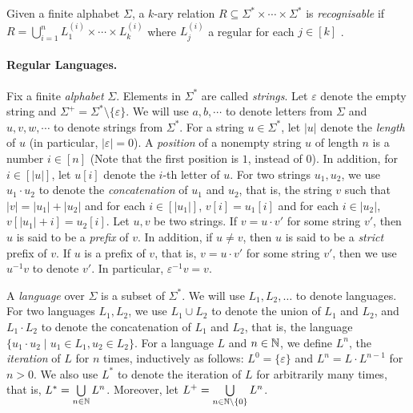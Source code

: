 \documentclass{llncs}
\newcommand{\tl}[1]{\color{blue} {TL: #1 :LT} \color{black}}
\newcommand{\tl}[1]{}
\begin{document}

\begin{definition}
	Given a finite alphabet $\Sigma$, a $k$-ary relation $R\subseteq \Sigma^*\times \cdots\times \Sigma^*$ is \emph{recognisable}  if $R=\bigcup_{i=1}^n L^{(i)}_1\times \cdots\times L^{(i)}_k$ where $L^{(i)}_j$ a regular for each $j\in [k]$ .
%
\end{definition}



\paragraph{Regular Languages.}
Fix a finite \emph{alphabet} $\Sigma$. Elements in $\Sigma^*$ are called \emph{strings}. Let $\varepsilon$ denote the empty string and  $\Sigma^+ = \Sigma^* \setminus \{\varepsilon\}$. We will use $a,b,\cdots$ to denote letters from $\Sigma$ and $u, v, w, \cdots$ to denote strings from $\Sigma^*$. For a string $u \in \Sigma^*$, let $|u|$ denote the \emph{length} of $u$ (in particular, $|\varepsilon|=0$). A \emph{position} of a nonempty string $u$ of length $n$ is a number $i \in [n]$ (Note that the first position is $1$, instead of  0). In addition, for $i \in [|u|]$, let $u[i]$ denote the $i$-th letter of $u$.
For two strings $u_1, u_2$, we use $u_1 \cdot u_2$ to denote the \emph{concatenation} of $u_1$ and $u_2$, that is, the string $v$ such that $|v|= |u_1| + |u_2|$ and for each $i \in [|u_1|]$, $v[i]= u_1[i]$ and for each $i \in |u_2|$, $v[|u_1|+i]=u_2[i]$. Let $u, v$ be two strings. If $v = u \cdot v'$ for some string $v'$, then $u$ is said to be a \emph{prefix} of $v$. In addition, if $u \neq v$, then $u$ is said to be a \emph{strict} prefix of $v$. If $u$ is a prefix of $v$, that is, $v = u \cdot v'$ for some string $v'$, then
we use $u^{-1} v$ to denote $v'$. In particular, $\varepsilon^{-1} v = v$.

A \emph{language} over $\Sigma$ is a subset of $\Sigma^*$. We will use $L_1, L_2, \dots$ to denote languages. For two languages $L_1, L_2$, we use $L_1 \cup L_2$ to denote the union of $L_1$ and $L_2$, and $L_1 \cdot L_2$ to denote the concatenation of $L_1$ and $L_2$, that is, the language $\{u_1 \cdot u_2 \mid u_1 \in L_1, u_2 \in L_2\}$. For a language $L$ and $n \in \mathbb{N}$, we define $L^n$, the \emph{iteration} of $L$ for $n$ times, inductively as follows: $L^0=\{\varepsilon\}$ and $L^{n} =L \cdot L^{n-1}$ for $n > 0$. We also use $L^*$ to denote the iteration of $L$ for arbitrarily many times, that is, $L^* = \bigcup \limits_{n \in \mathbb{N}} L^n$. Moreover, let $L^+ = \bigcup \limits_{n \in \mathbb{N} \setminus \{0\}} L^n$.
\end{document}
